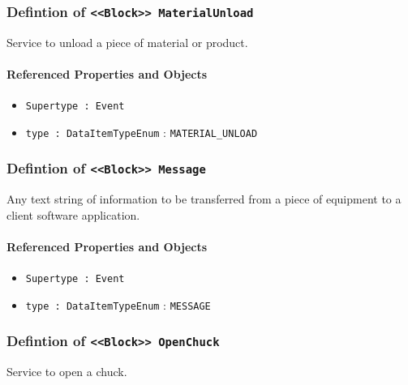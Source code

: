 \subsubsection{Defintion of \texttt{<<Block>> MaterialUnload}}
  \label{type:MaterialUnload}

\FloatBarrier

Service to unload a piece of material or product.

\FloatBarrier
\paragraph{Referenced Properties and Objects}

\begin{itemize}
\item \texttt{Supertype : Event}

\item \texttt{type : DataItemTypeEnum} : \texttt{MATERIAL_UNLOAD}

\end{itemize}
\FloatBarrier
\subsubsection{Defintion of \texttt{<<Block>> Message}}
  \label{type:Message}

\FloatBarrier

Any text string of information to be transferred from a piece of equipment to a client software application.

\FloatBarrier
\paragraph{Referenced Properties and Objects}

\begin{itemize}
\item \texttt{Supertype : Event}

\item \texttt{type : DataItemTypeEnum} : \texttt{MESSAGE}

\end{itemize}
\FloatBarrier
\subsubsection{Defintion of \texttt{<<Block>> OpenChuck}}
  \label{type:OpenChuck}

\FloatBarrier

Service to open a chuck.

